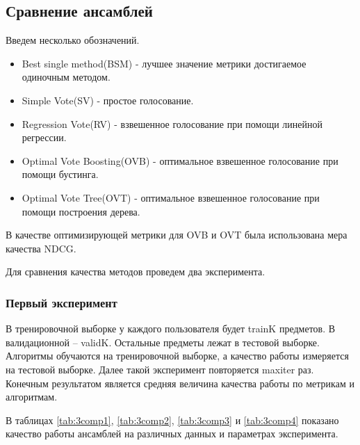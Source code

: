 \documentclass[14pt]{extarticle}
\begin{document}
\subsection{Сравнение  ансамблей}
Введем несколько обозначений.
\begin{itemize}
\item 
Best single method(BSM) - лучшее значение метрики достигаемое одиночным методом.
\item 
Simple Vote(SV)  - простое голосование.
\item 
Regression Vote(RV) - взвешенное голосование при помощи линейной регрессии.
\item 
Optimal Vote Boosting(OVB) - оптимальное взвешенное голосование при помощи бустинга.
\item 
Optimal Vote Tree(OVT) - оптимальное взвешенное голосование при помощи построения дерева.
\end{itemize}

В качестве оптимизирующей метрики для OVB и OVT была использована мера качества NDCG.

Для сравнения качества методов проведем два эксперимента. 

\subsubsection{Первый эксперимент}
  
  В тренировочной выборке у каждого пользователя будет trainK предметов. В валидационной -- validK. Остальные предметы лежат в тестовой выборке. Алгоритмы обучаются на тренировочной выборке, а качество работы измеряется на тестовой выборке. Далее такой эксперимент повторяется maxiter раз. Конечным результатом является средняя величина качества работы по метрикам и алгоритмам. 

В таблицах \ref{tab:3comp1}, \ref{tab:3comp2}, \ref{tab:3comp3} и \ref{tab:3comp4} показано качество работы ансамблей на различных данных и параметрах эксперимента.
\end{document}
